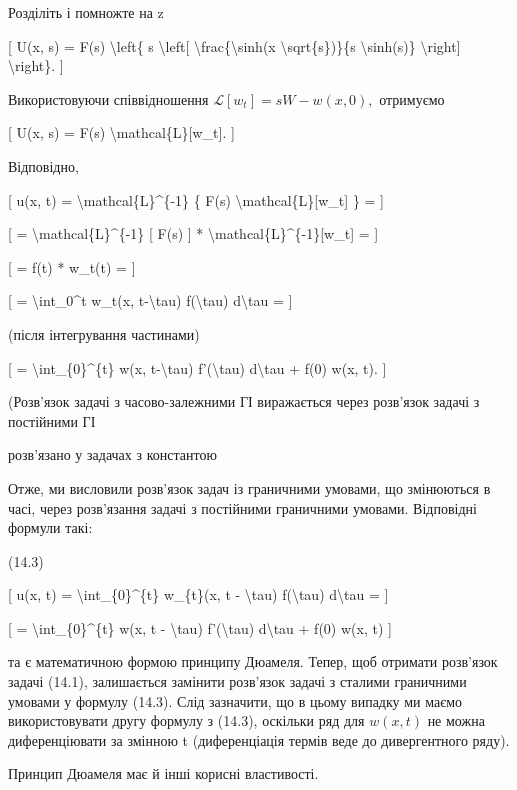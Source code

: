 \documentclass[
]{article}
\begin{document}
Розділіть і помножте на z

{[} U(x, s) = F(s) \textbackslash left\{ s \textbackslash left{[}
\textbackslash frac\{\textbackslash sinh(x
\textbackslash sqrt\{s\})\}\{s \textbackslash sinh(s)\}
\textbackslash right{]} \textbackslash right\}. {]}

Використовуючи співвідношення \(\mathscr{L}[w_t] = sW - w(x, 0),\)
отримуємо

{[} U(x, s) = F(s) \textbackslash mathcal\{L\}{[}w\_t{]}. {]}

Відповідно,

{[} u(x, t) = \textbackslash mathcal\{L\}\^{}\{-1\} \{ F(s)
\textbackslash mathcal\{L\}{[}w\_t{]} \} = {]}

{[} = \textbackslash mathcal\{L\}\^{}\{-1\} {[} F(s) {]} *
\textbackslash mathcal\{L\}\^{}\{-1\}{[}w\_t{]} = {]}

{[} = f(t) * w\_t(t) = {]}

{[} = \textbackslash int\_0\^{}t w\_t(x, t-\textbackslash tau)
f(\textbackslash tau) d\textbackslash tau = {]}

(після інтегрування частинами)

{[} = \textbackslash int\_\{0\}\^{}\{t\} w(x, t-\textbackslash tau)
f'(\textbackslash tau) d\textbackslash tau + f(0) w(x, t). {]}

(Розв'язок задачі з часово-залежними ГІ виражається через розв'язок
задачі з постійними ГІ

розв'язано у задачах з константою

Отже, ми висловили розв'язок задач із граничними умовами, що змінюються
в часі, через розв'язання задачі з постійними граничними умовами.
Відповідні формули такі:

(14.3)

{[} u(x, t) = \textbackslash int\_\{0\}\^{}\{t\} w\_\{t\}(x, t -
\textbackslash tau) f(\textbackslash tau) d\textbackslash tau = {]}

{[} = \textbackslash int\_\{0\}\^{}\{t\} w(x, t - \textbackslash tau)
f'(\textbackslash tau) d\textbackslash tau + f(0) w(x, t) {]}

та є математичною формою принципу Дюамеля. Тепер, щоб отримати розв'язок
задачі (14.1), залишається замінити розв'язок задачі з сталими
граничними умовами у формулу (14.3). Слід зазначити, що в цьому випадку
ми маємо використовувати другу формулу з (14.3), оскільки ряд для
\(w(x, t)\) не можна диференціювати за змінною t (диференціація термів
веде до дивергентного ряду).

Принцип Дюамеля має й інші корисні властивості.
\end{document}
